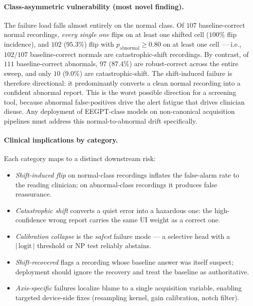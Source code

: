 \paragraph{Class-asymmetric vulnerability (most novel finding).} The failure load falls almost entirely on the normal class. Of $107$ baseline-correct normal recordings, \emph{every single one} flips on at least one shifted cell ($100\%$ flip incidence), and $102$ ($95.3\%$) flip with $p_{\text{abnormal}}\!\geq\!0.80$ on at least one cell --- i.e., $102/107$ baseline-correct normals are catastrophic-shift recordings. By contrast, of $111$ baseline-correct abnormals, $97$ ($87.4\%$) are robust-correct across the entire sweep, and only $10$ ($9.0\%$) are catastrophic-shift. The shift-induced failure is therefore directional: it predominantly converts a clean normal recording into a confident abnormal report. This is the worst possible direction for a screening tool, because abnormal false-positives drive the alert fatigue that drives clinician disuse. Any deployment of EEGPT-class models on non-canonical acquisition pipelines must address this normal-to-abnormal drift specifically.

\paragraph{Clinical implications by category.} Each category maps to a distinct downstream risk:
\begin{itemize}\setlength{\itemsep}{1pt}
  \item \emph{Shift-induced flip} on normal-class recordings inflates the false-alarm rate to the reading clinician; on abnormal-class recordings it produces false reassurance.
  \item \emph{Catastrophic shift} converts a quiet error into a hazardous one: the high-confidence wrong report carries the same UI weight as a correct one.
  \item \emph{Calibration collapse} is the \emph{safest} failure mode --- a selective head with a $|\,\text{logit}\,|$ threshold or NP test reliably abstains.
  \item \emph{Shift-recovered} flags a recording whose baseline answer was itself suspect; deployment should ignore the recovery and treat the baseline as authoritative.
  \item \emph{Axis-specific} failures localize blame to a single acquisition variable, enabling targeted device-side fixes (resampling kernel, gain calibration, notch filter).
\end{itemize}

